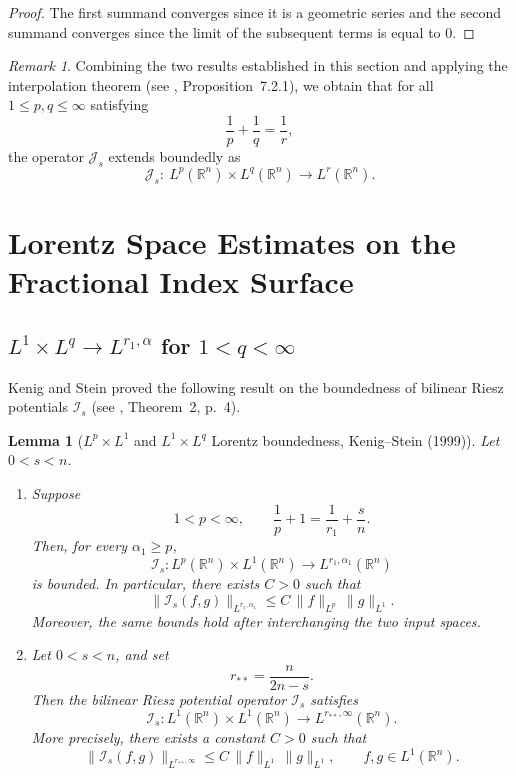 \documentclass[12pt]{article}
\newtheorem{lemma}[theorem]{Lemma}
\theoremstyle{definition}
\theoremstyle{remark}
\newtheorem{remark}[theorem]{Remark}
\numberwithin{equation}{section}
\begin{document}
\begin{proof}
The first summand converges since it is a geometric series and the second summand converges since the limit of the subsequent terms is equal to 0. \end{proof}

\begin{remark}
Combining the two results established in this section and applying the interpolation theorem (see \cite{GraMod}, Proposition~7.2.1), we obtain that for all $1\le p,q\le\infty$ satisfying
\[
\frac1p+\frac1q=\frac1r,
\]
the operator $\mathcal J_s$ extends boundedly as
\[
\mathcal J_s:\ L^p(\mathbb R^n)\times L^q(\mathbb R^n)\longrightarrow L^r(\mathbb R^n).
\]
\end{remark}





\section{Lorentz Space Estimates on the Fractional Index Surface}

\subsection{ $L^1\times L^q \longrightarrow L^{r_1,\alpha}$ for $1<q<\infty$}\label{sec:L1LQ}

Kenig and Stein proved the following result on the boundedness of bilinear Riesz potentials $\mathcal{I}_s$ (see \cite{KenSte}, Theorem~2, p.~4).

\begin{lemma}[$L^p\times L^1$ and $L^1\times L^q$ Lorentz boundedness, Kenig--Stein (1999)]
\label{lem:L1LQ}
Let $0<s<n$.
\begin{enumerate}
\item \label{item:lp-l1}  Suppose
\[
1<p<\infty,
\qquad
\frac{1}{p}+1=\frac{1}{r_1}+\frac{s}{n}.
\]
Then, for every $\alpha_1\ge p$,
\[
\mathcal{I}_s:
L^p(\mathbb R^n)\times L^1(\mathbb R^n)
\longrightarrow
L^{r_1,\alpha_1}(\mathbb R^n)
\]
is bounded. In particular, there exists $C>0$ such that
\[
\|\mathcal{I}_s(f,g)\|_{L^{r_1,\alpha_1}}
\le C\,\|f\|_{L^p}\,\|g\|_{L^1}.
\]
Moreover, the same bounds hold after interchanging the two input spaces.
\item \label{item:l1-l1}
Let $0<s<n$, and set
\[
r_{**}=\frac{n}{2n-s}.
\]
Then the bilinear Riesz potential operator $\mathcal I_s$ satisfies
\[
\mathcal I_s:
L^1(\mathbb R^n)\times L^1(\mathbb R^n)
\longrightarrow
L^{r_{**},\infty}(\mathbb R^n).
\]
More precisely, there exists a constant $C>0$ such that
\[
\|\mathcal I_s(f,g)\|_{L^{r_{**},\infty}}
\le C\,\|f\|_{L^1}\,\|g\|_{L^1},
\qquad
f,g\in L^1(\mathbb R^n).
\] 
\end{enumerate}
\end{lemma}
\end{document}
